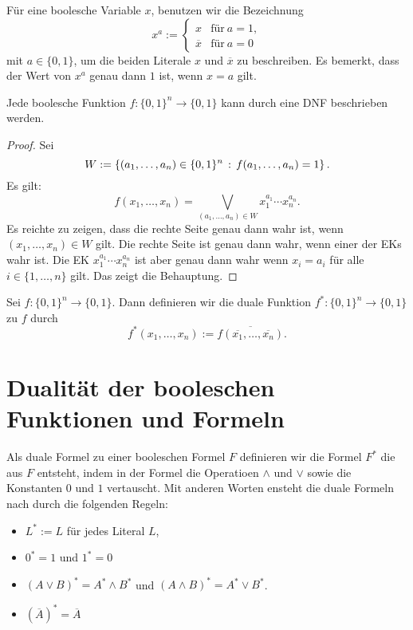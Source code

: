 \begin{bem}
	Für eine boolesche Variable $x$, benutzen wir die Bezeichnung 
	\[
	x^a := \begin{cases} 
		x & \text{für} \ a=1,
		\\				\overline{x} & \text{für} \ a=0
	\end{cases} 
	\]
	mit $a \in \{0,1\}$, um die beiden Literale $x$ und $\overline{x}$ zu beschreiben. 
	Es bemerkt, dass der Wert von $x^a$ genau dann $1$ ist, wenn $x=a$ gilt. 
\end{bem} 

\begin{thm}
	Jede boolesche Funktion $ f: \{0,1\}^n \to \{0,1\}$ kann durch eine DNF beschrieben werden. 
\end{thm} 
\begin{proof}
	Sei 
	\[
	W := \left\{  (a_1,\ldots,a_n) \in \{0,1\}^n \,:\, f(a_1,\ldots,a_n) = 1 \right\}. 
	\]
	Es gilt: 
	\[
	f(x_1,\ldots,x_n) = \bigvee_{ (a_1,\ldots,a_n) \in W} x_1^{a_1} \cdots x_n^{a_n}. 
	\]
	Es reichte zu zeigen, dass die rechte Seite genau dann wahr ist, wenn $(x_1,\ldots,x_n) \in W$ gilt. Die rechte Seite ist genau dann wahr, wenn einer der EKs wahr ist. Die EK $x_1^{a_1} \cdots x_n^{a_n}$ ist aber genau dann wahr wenn $x_i = a_i$ für alle $i \in\{1,\ldots,n\}$ gilt. Das zeigt die Behauptung. 
\end{proof} 

\begin{defn}
	Sei $f : \{0,1\}^n \to \{0,1\}$. Dann definieren wir die duale Funktion $f^\ast : \{0,1\}^n \to \{0,1\}$ zu $f$ durch 
	\[
	f^\ast(x_1,\ldots,x_n) := \overline{ f(\overline{x_1},\ldots,\overline{x_n})}. 
	\]
\end{defn} 

\section{Dualität der booleschen Funktionen und Formeln} 

\begin{defn}
	Als duale Formel zu einer booleschen Formel $F$ definieren wir die Formel $F^\ast$ die aus $F$ entsteht, indem in der Formel die Operatioen $\wedge$ und $\vee$ sowie die Konstanten $0$ und $1$ vertauscht. Mit anderen Worten ensteht die duale Formeln nach durch die folgenden Regeln:
	\begin{itemize} 
		\item $L^\ast := L$ für jedes Literal $L$, 
		\item $0^\ast = 1$ und $1^\ast = 0$ 
		\item $(A \vee B)^\ast = A^\ast \wedge B^\ast$ und $(A \wedge B)^\ast = A^\ast \vee B^\ast$.
		\item $(\overline{A})^\ast = \overline{A}$
	\end{itemize}  
\end{defn} 

